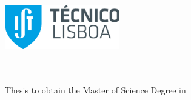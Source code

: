 
\begin{titlepage}
\includegraphics[width=5cm]{images/ist_logo}~\\[2.0cm]
\begin{center}
{\LARGE \textbf{\Title}}\\[2.5cm]
{\Large \textbf{\StudentName}}\\[2.0cm]
{\large Thesis to obtain the Master of Science Degree in}\\[0.5cm]
{\LARGE \textbf{\DegreeName}}\\[1.5cm]


\end{center}
\end{titlepage}
